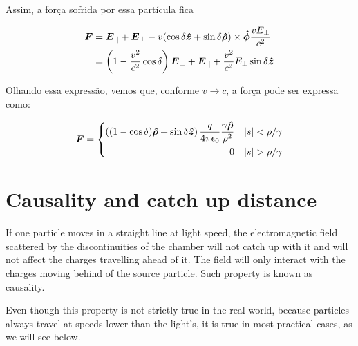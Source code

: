 \begin{apendicesenv}
    Assim, a força sofrida por essa partícula fica

    \begin{equation}\begin{aligned}
    	\boldsymbol{F} &= \boldsymbol{E}_{||} + \boldsymbol{E}_\perp - v(\cos\delta \boldsymbol{\hat{z}} + \sin\delta\boldsymbol{\hat{\rho}}) \times \boldsymbol{\hat{\phi}}\frac{vE_\perp}{c^2} \\
		&= \left(1-\frac{v^2}{c^2}\cos\delta\right)\boldsymbol{E}_\perp + \boldsymbol{E}_{||} + \frac{v^2}{c^2}E_\perp\sin\delta\boldsymbol{\hat{z}}
    \end{aligned}\end{equation}

    Olhando essa expressão, vemos que, conforme $v \to c$, a força pode ser expressa como:

    \begin{equation}
    	\vect{F} = \left\{
    	\begin{aligned}
    		\left((1-\cos\delta)\vect{\hat{\rho}} + \sin\delta\vect{\hat{z}}\right)
    		\frac{q}{4\pi\epsilon_0} \frac{\gamma\vect{\hat{\rho}}}{\rho^2} & &|s|<\rho/\gamma\\
    		0 & &|s|>\rho/\gamma
    	\end{aligned}\right.
    \end{equation}


\chapter{Causality and catch up distance}\label{app:causality}

    If one particle moves in a straight line at light speed, the electromagnetic field scattered by the discontinuities of the chamber will not catch up with it and will not affect the charges travelling ahead of it. The field will only interact with the charges moving behind of the source particle. Such property is known as causality.

    Even though this property is not strictly true in the real world, because particles always travel at speeds lower than the light's, it is true in most practical cases, as we will see below.


\end{apendicesenv}
